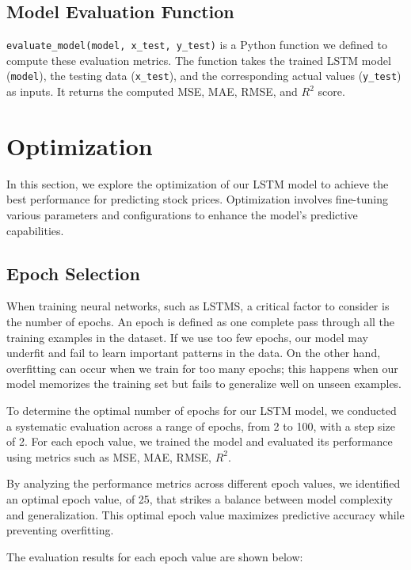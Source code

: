 \documentclass[10pt,twocolumn,letterpaper]{article}
\begin{document}
\subsection{Model Evaluation Function}
 \texttt{evaluate\_model(model, x\_test, y\_test)} is a Python function we defined
to compute these evaluation metrics. The function takes the trained LSTM 
model (\texttt{model}), the testing data (\texttt{x\_test}), and the corresponding 
actual values (\texttt{y\_test}) as inputs. It returns the computed MSE, MAE, RMSE, 
and $R^2$ score.

\section{Optimization}
\label{sec:optimization}
In this section, we explore the optimization of our LSTM model to achieve 
the best performance for predicting stock prices. Optimization involves 
fine-tuning various parameters and configurations to enhance the model's 
predictive capabilities.

\subsection{Epoch Selection}

When training neural networks, such as LSTMS, a critical factor to consider 
is the number of epochs. An epoch is defined as one complete pass through all 
the training examples in the dataset. If we use too few epochs, our model may 
underfit and fail to learn important patterns in the data. On the other hand, 
overfitting can occur when we train for too many epochs; this happens when our 
model memorizes the training set but fails to generalize well on unseen examples.

To determine the optimal number of epochs for our LSTM model, we 
conducted a systematic evaluation across a range of epochs, from 2 to 100, 
with a step size of 2. For each epoch value, we trained the model and evaluated 
its performance using metrics such as MSE, MAE, RMSE, $R^2$.

By analyzing the performance metrics across different epoch values, we identified 
an optimal epoch value, of 25, that strikes a balance between model complexity 
and generalization. This optimal epoch value maximizes predictive accuracy while 
preventing overfitting.

The evaluation results for each epoch value are shown below:
\end{document}
